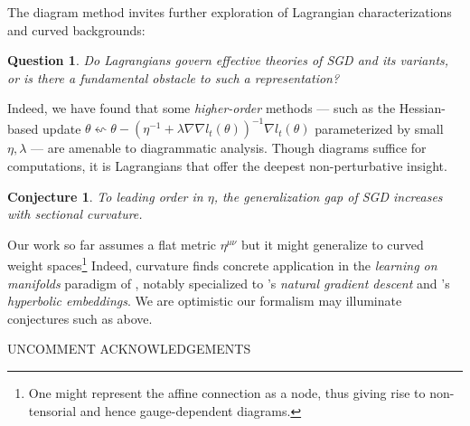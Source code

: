\documentclass{article}
\newtheorem{quest}{Question}
\newtheorem{conj}{Conjecture}
\begin{document}
    The diagram method invites further exploration of Lagrangian
    characterizations and curved backgrounds: 
    \begin{quest}
        Do Lagrangians govern effective theories of SGD and its variants, or
        is there a fundamental obstacle to such a representation?
    \end{quest}
        Indeed, we have found that some
        \emph{higher-order} methods --- such as the Hessian-based update
        $
            \theta \leftsquigarrow
            \theta -
            (\eta^{-1} + \lambda \nabla \nabla l_t(\theta))^{-1}
            \nabla l_t(\theta)
        $
        parameterized by small $\eta, \lambda$ --- are amenable to diagrammatic
        analysis.  Though diagrams suffice for computations, it is Lagrangians
        that offer the deepest non-perturbative insight.
    \begin{conj}
        To leading order in $\eta$, the generalization gap of SGD  
        increases with sectional curvature.
    \end{conj}
        Our work so far assumes a flat metric $\eta^{\mu\nu}$ but it might 
        generalize to curved weight spaces\footnote{
            One might represent the affine connection as a node, thus giving
            rise to non-tensorial and hence gauge-dependent diagrams.
        }
        Indeed, curvature finds concrete application in the \emph{learning on
        manifolds} paradigm of \citet{bo13}, notably specialized to
        \citet{am98}'s \emph{natural gradient descent} and \citet{ni17}'s
        \emph{hyperbolic embeddings}.  We are optimistic our formalism may
        illuminate conjectures such as above.


{\color{moor} UNCOMMENT ACKNOWLEDGEMENTS}
\end{document}
